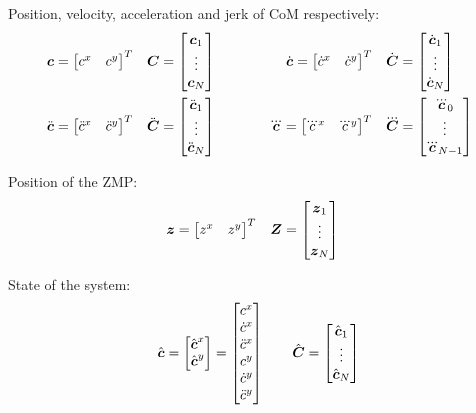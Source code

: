 \documentclass[12pt,a4paper]{article}
\begin{document}
Position, velocity, acceleration and jerk of CoM respectively:
\begin{align*}
\cpos = \begin{bmatrix} c^x & c^y \end{bmatrix}^T
\quad&
\cPos = \begin{bmatrix} \cpos_1 \\ \vdots \\ \cpos_N \end{bmatrix}
\quad\quad\quad&
\cvel = \begin{bmatrix} \dot{c}^x & \dot{c}^y \end{bmatrix}^T
\quad&
\cVel = \begin{bmatrix} \cvel_1 \\ \vdots \\ \cvel_N \end{bmatrix}
\\
%
\cacc = \begin{bmatrix} \ddot{c}^x & \ddot{c}^y \end{bmatrix}^T
\quad&
\cAcc = \begin{bmatrix} \cacc_1 \\ \vdots \\ \cacc_N \end{bmatrix}
\quad\quad\quad&
\cjerk = \begin{bmatrix} \dddot{c}^x & \dddot{c}^y \end{bmatrix}^T
\quad&
\cJerk = \begin{bmatrix} \cjerk_0 \\ \vdots \\ \cjerk_{N-1} \end{bmatrix}
\end{align*}

Position of the ZMP:
\begin{align*}
\mbox{\boldmath $z$} = \begin{bmatrix} z^x & z^y \end{bmatrix}^T
\quad &
\mbox{\boldmath $Z$} = \begin{bmatrix} \mbox{\boldmath $z$}_1 \\ \vdots \\ \mbox{\boldmath $z$}_N \end{bmatrix}
\end{align*}

State of the system:
\begin{equation*}
\hat{\mbox{\boldmath $c$}} = \begin{bmatrix} \hat{\mbox{\boldmath $c$}}^x \\ \hat{\mbox{\boldmath $c$}}^y \end{bmatrix} =
          \begin{bmatrix} c^x \\ \dot{c}^x \\ \ddot{c}^x \\ c^y \\ \dot{c}^y \\ \ddot{c}^y \end{bmatrix}
\quad\quad
\hat{\mbox{\boldmath $C$}} = \begin{bmatrix} \hat{\mbox{\boldmath $c$}}_1 \\ \vdots \\ \hat{\mbox{\boldmath $c$}}_N \end{bmatrix}\\
\end{equation*}
\end{document}

